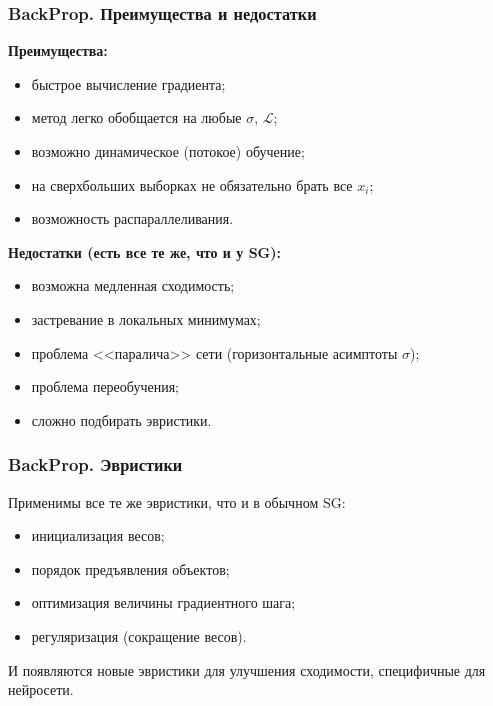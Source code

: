 \documentclass[10pt]{beamer}
\begin{document}
\begin{frame}
\frametitle{BackProp. Преимущества и недостатки}
\textbf{Преимущества:}
\begin{itemize}
\item быстрое вычисление градиента;
\item метод легко обобщается на любые $\sigma$, $\mathscr{L}$;
\item возможно динамическое (потокое) обучение;
\item на сверхбольших выборках не обязательно брать все $x_i$;
\item возможность распараллеливания.
\end{itemize}
\vspace{0.7cm} 
\textbf{Недостатки (есть все те же, что и у SG):}
\begin{itemize}
\item возможна медленная сходимость;
\item застревание в локальных минимумах;
\item проблема <<паралича>> сети (горизонтальные асимптоты $\sigma$); 
\item проблема переобучения;
\item сложно подбирать эвристики.
\end{itemize}
\end{frame} 
  
\begin{frame}
\frametitle{BackProp. Эвристики}
Применимы все те же эвристики, что и в обычном SG:
\begin{itemize}
\item инициализация весов;
\item порядок предъявления объектов;
\item оптимизация величины градиентного шага;
\item регуляризация (сокращение весов). 
\end{itemize} 
 \vspace{0.7cm}
 И появляются новые эвристики для улучшения сходимости, специфичные для нейросети.

\end{frame} 
\end{document}
